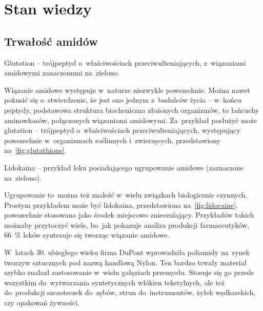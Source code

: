 \chapter{Stan wiedzy}


\section{Trwałość amidów}

\begin{marginfigure}[7\baselineskip]
  
  \caption{
    Glutation \--- trójpeptyd o~właściwościach przeciwulteniających,
    z~wiązaniami amidowymi zanaczonumi na~zielono.
  }
  \label{fig:glutathione}
\end{marginfigure}
Wiązanie amidowe występuje w~naturze niezwykle powszechnie.
Można nawet pokusić się o~stwierdzenie, że jest ono jednym z~budulców życia \---
w~końcu peptydy, podstawowa struktura biocheniczna złożonych organizmów,
to łańcuchy aminowkasów, połączonych wiązaniami amidowymi.
Za~przykład posłużyć może glutation \--- trójpeptyd o~właściwościach przeciwulteniających,
występujący powszechnie w~organizmach roślinnych i~zwierzęcych\autocite{wu04},
przedstawiony na~\cref{fig:glutathione}.
  
\begin{marginfigure}
  
  \caption{
    Lidokaina \--- przykład leku posiadającego ugrupowanie amidowe
    (zaznaczone na~zielono).
  }
  \label{fig:lidocaine}
\end{marginfigure}
Ugrupowanie to~można też znaleźć w~wielu związkach biologicznie czynnych.
Prostym przykładem może być lidokaina, przedstawiona na~\cref{fig:lidocaine},
powszechnie stosowana jako środek miejscowo znieczulający.
Przykładów takich możnaby przytoczyć wiele, bo~jak pokazuje analiza produkcji farmaceutyków,
\SI{66}{\percent} leków syntezuje się tworząc wiązanie amidowe\autocite{carey06}.

W~latach 30. ubiegłego wieku firma DuPont wprowadziła poliamidy na~rynek tworzyw sztucznych pod nazwą handlową Nylon.
Ten bardzo trwały materiał szybko znalazł zastosowanie w~wielu gałęziach przemysłu.
Stosuje się go przede wszystkim do~wytwarzania syntetycznych włókien tekstylnych,
ale też do~produkcji szczoteczek do~zębów, strun do~instrumentów, żyłek wędkarskich, czy opakowań żywności.

